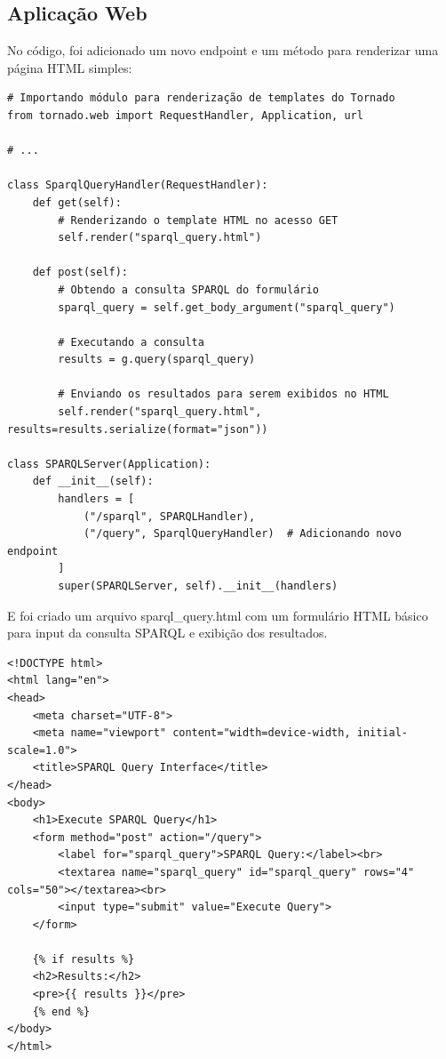 \subsection{Aplicação Web}

No código, foi adicionado um novo endpoint e um método para renderizar uma página HTML simples:

\begin{verbatim}
# Importando módulo para renderização de templates do Tornado
from tornado.web import RequestHandler, Application, url

# ...

class SparqlQueryHandler(RequestHandler):
    def get(self):
        # Renderizando o template HTML no acesso GET
        self.render("sparql_query.html")
    
    def post(self):
        # Obtendo a consulta SPARQL do formulário
        sparql_query = self.get_body_argument("sparql_query")
        
        # Executando a consulta
        results = g.query(sparql_query)
        
        # Enviando os resultados para serem exibidos no HTML
        self.render("sparql_query.html", results=results.serialize(format="json"))

class SPARQLServer(Application):
    def __init__(self):
        handlers = [
            ("/sparql", SPARQLHandler),
            ("/query", SparqlQueryHandler)  # Adicionando novo endpoint
        ]
        super(SPARQLServer, self).__init__(handlers)
\end{verbatim}

E foi criado um arquivo sparql\_query.html com um formulário HTML básico para input da consulta SPARQL e exibição dos resultados.

\begin{verbatim}
<!DOCTYPE html>
<html lang="en">
<head>
    <meta charset="UTF-8">
    <meta name="viewport" content="width=device-width, initial-scale=1.0">
    <title>SPARQL Query Interface</title>
</head>
<body>
    <h1>Execute SPARQL Query</h1>
    <form method="post" action="/query">
        <label for="sparql_query">SPARQL Query:</label><br>
        <textarea name="sparql_query" id="sparql_query" rows="4" cols="50"></textarea><br>
        <input type="submit" value="Execute Query">
    </form>
    
    {% if results %}
    <h2>Results:</h2>
    <pre>{{ results }}</pre>
    {% end %}
</body>
</html>
\end{verbatim}

